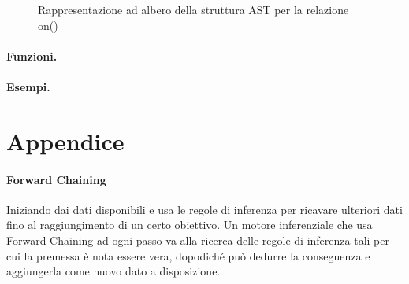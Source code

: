 \documentclass[12pt,twoside]{report}
\begin{document}
\begin{figure}[h]
\centering
{}
\caption{Rappresentazione ad albero della struttura AST per la relazione on()}
\label{fig:ast_structure}
\end{figure}

\paragraph{Funzioni.}
\paragraph{Esempi.}



\section*{Appendice}
\paragraph{Forward Chaining} Iniziando dai dati disponibili e usa le regole di inferenza per ricavare ulteriori dati fino al raggiungimento di un certo obiettivo. Un motore inferenziale che usa Forward Chaining ad ogni passo va alla ricerca delle regole di inferenza tali per cui la premessa è nota essere vera, dopodiché può dedurre la conseguenza e aggiungerla come nuovo dato a disposizione.
\end{document}
